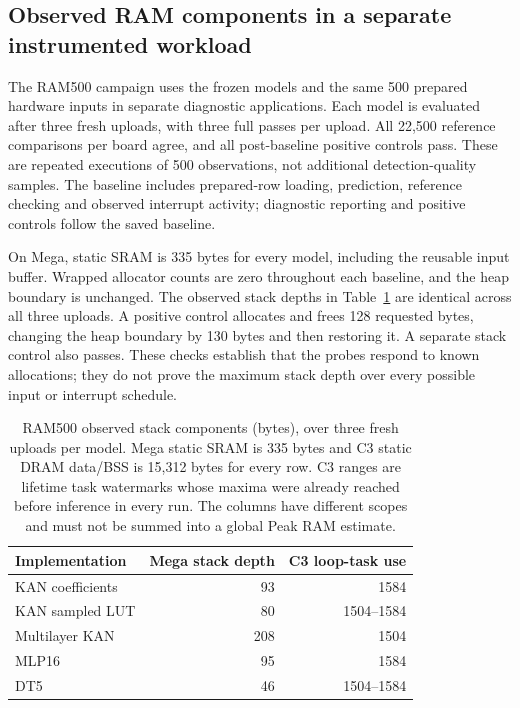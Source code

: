 \subsection{Observed RAM components in a separate instrumented workload}
\label{sec:ram500}
The RAM500 campaign uses the frozen models and the same 500 prepared hardware inputs in separate diagnostic applications. Each model is evaluated after three fresh uploads, with three full passes per upload. All 22,500 reference comparisons per board agree, and all post-baseline positive controls pass. These are repeated executions of 500 observations, not additional detection-quality samples. The baseline includes prepared-row loading, prediction, reference checking and observed interrupt activity; diagnostic reporting and positive controls follow the saved baseline.

On Mega, static SRAM is 335 bytes for every model, including the reusable input buffer. Wrapped allocator counts are zero throughout each baseline, and the heap boundary is unchanged. The observed stack depths in Table~\ref{tab:ram500} are identical across all three uploads. A positive control allocates and frees 128 requested bytes, changing the heap boundary by 130 bytes and then restoring it. A separate stack control also passes. These checks establish that the probes respond to known allocations; they do not prove the maximum stack depth over every possible input or interrupt schedule.

\begin{table}[t]
\caption{RAM500 observed stack components (bytes), over three fresh uploads per model. Mega static SRAM is 335 bytes and C3 static DRAM data/BSS is 15,312 bytes for every row. C3 ranges are lifetime task watermarks whose maxima were already reached before inference in every run. The columns have different scopes and must not be summed into a global Peak RAM estimate.}
\label{tab:ram500}
\centering\footnotesize
\begin{tabular}{lrr}
\toprule
Implementation & Mega stack depth & C3 loop-task use\\
\midrule
KAN coefficients & 93 & 1584\\
KAN sampled LUT & 80 & 1504--1584\\
Multilayer KAN & 208 & 1504\\
MLP16 & 95 & 1584\\
DT5 & 46 & 1504--1584\\
\bottomrule
\end{tabular}
\end{table}

